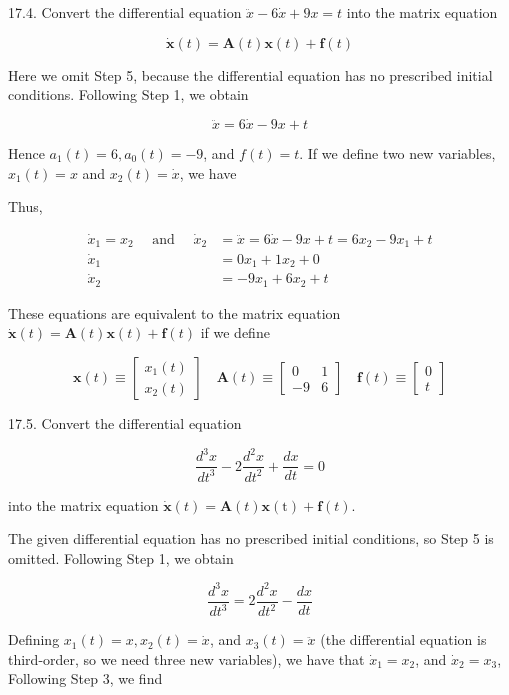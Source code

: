 \documentclass[10pt]{article}
\begin{document}
17.4. Convert the differential equation $\ddot{x}-6 \dot{x}+9 x=t$ into the matrix equation

$$
\dot{\mathbf{x}}(t)=\mathbf{A}(t) \mathbf{x}(t)+\mathbf{f}(t)
$$

Here we omit Step 5, because the differential equation has no prescribed initial conditions. Following Step 1, we obtain

$$
\ddot{x}=6 \dot{x}-9 x+t
$$

Hence $a_{1}(t)=6, a_{0}(t)=-9$, and $f(t)=t$. If we define two new variables, $x_{1}(t)=x$ and $x_{2}(t)=\dot{x}$, we have

Thus,

$$
\begin{aligned}
\dot{x}_{1}=x_{2} \quad \text { and } \quad \dot{x}_{2} & =\ddot{x}=6 \dot{x}-9 x+t=6 x_{2}-9 x_{1}+t \\
\dot{x}_{1} & =0 x_{1}+1 x_{2}+0 \\
\dot{x}_{2} & =-9 x_{1}+6 x_{2}+t
\end{aligned}
$$

These equations are equivalent to the matrix equation $\dot{\mathbf{x}}(t)=\mathbf{A}(t) \mathbf{x}(t)+\mathbf{f}(t)$ if we define

$$
\mathbf{x}(t) \equiv\left[\begin{array}{l}
x_{1}(t) \\
x_{2}(t)
\end{array}\right] \quad \mathbf{A}(t) \equiv\left[\begin{array}{rr}
0 & 1 \\
-9 & 6
\end{array}\right] \quad \mathbf{f}(t) \equiv\left[\begin{array}{l}
0 \\
t
\end{array}\right]
$$

17.5. Convert the differential equation

$$
\frac{d^{3} x}{d t^{3}}-2 \frac{d^{2} x}{d t^{2}}+\frac{d x}{d t}=0
$$

into the matrix equation $\dot{\mathbf{x}}(t)=\mathbf{A}(t) \mathbf{x}(\mathrm{t})+\mathbf{f}(t)$.

The given differential equation has no prescribed initial conditions, so Step 5 is omitted. Following Step 1, we obtain

$$
\frac{d^{3} x}{d t^{3}}=2 \frac{d^{2} x}{d t^{2}}-\frac{d x}{d t}
$$

Defining $x_{1}(t)=x, x_{2}(t)=\dot{x}$, and $x_{3}(t)=\ddot{x}$ (the differential equation is third-order, so we need three new variables), we have that $\dot{x}_{1}=x_{2}$, and $\dot{x}_{2}=x_{3}$, Following Step 3, we find
\end{document}
